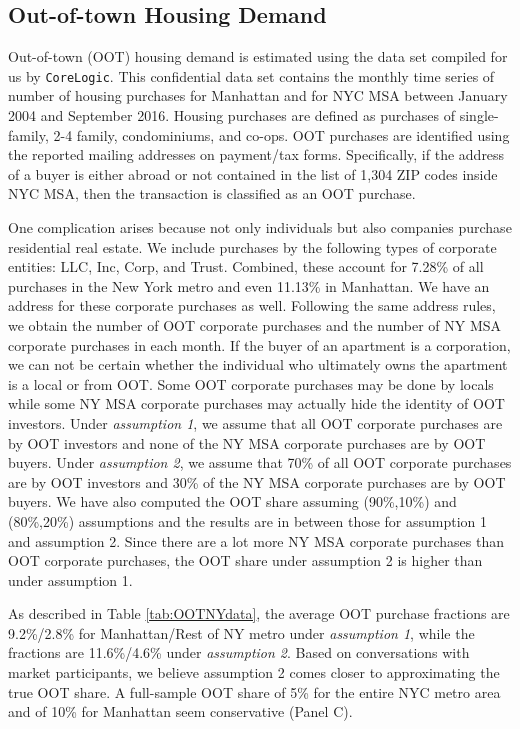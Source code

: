 \documentclass[letterpaper,12pt,dvipsnames,usenames]{article}
\theoremstyle{definition}
\begin{document}
\begin{spacing}{1.0}
\begin{small}
\subsection{Out-of-town Housing Demand} \label{app:corelogic}
Out-of-town (OOT) housing demand is estimated using the data set compiled for us by {\tt CoreLogic}. This confidential data set contains the monthly time series of number of housing purchases for Manhattan and for NYC MSA between January 2004 and September 2016. Housing purchases are defined as purchases of single-family, 2-4 family, condominiums, and co-ops. OOT purchases are identified using the reported mailing addresses on payment/tax forms. Specifically, if the address of a buyer is either abroad or not contained in the list of 1,304 ZIP codes inside NYC MSA, then the transaction is classified as an OOT purchase.


One complication arises because not only individuals but also companies purchase residential real estate. We include purchases by the following types of corporate entities: LLC, Inc, Corp, and Trust. Combined, these account for 7.28\% of all purchases in the New York metro and even 11.13\% in Manhattan. We have an address for these corporate purchases as well. Following the same address rules, we obtain the number of OOT corporate purchases and the number of NY MSA corporate purchases in each month. If the buyer of an apartment is a corporation, we can not be certain whether the individual who ultimately owns the apartment is a local or from OOT. Some OOT corporate purchases may be done by locals while some NY MSA corporate purchases may actually hide the identity of OOT investors. Under \emph{assumption 1}, we assume that all OOT corporate purchases are by OOT investors and none of the NY MSA corporate purchases are by OOT buyers. Under \emph{assumption 2}, we assume that 70\% of all OOT corporate purchases are by OOT investors and 30\% of the NY MSA corporate purchases are by OOT buyers. We have also computed the OOT share assuming (90\%,10\%) and (80\%,20\%) assumptions and the results are in between those for assumption 1 and assumption 2. Since there are a lot more NY MSA corporate purchases than OOT corporate purchases, the OOT share under assumption 2 is higher than under assumption 1.

As described in Table \ref{tab:OOTNYdata}, the average OOT purchase fractions are 9.2\%/2.8\% for Manhattan/Rest of NY metro under \textit{assumption 1}, while the fractions are 11.6\%/4.6\% under \textit{assumption 2}. Based on conversations with market participants, we believe assumption 2 comes closer to approximating the true OOT share. A full-sample OOT share of 5\% for the entire NYC metro area and of 10\% for Manhattan seem conservative (Panel C).


\end{small}
\end{spacing}
\end{document}
